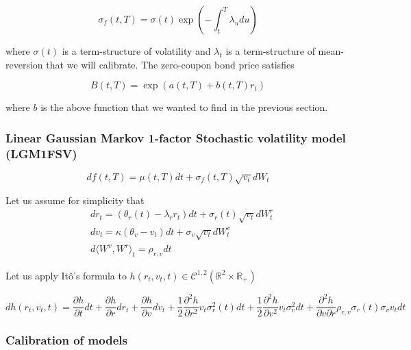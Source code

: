 \documentclass{article}
\begin{document}
\begin{equation}
	\sigma_f(t,T) = \sigma(t) \exp\left(-\int_t^T \lambda_u du \right)
\end{equation}

\noindent where $\sigma(t)$ is a term-structure of volatility and $\lambda_t$ is a term-structure of mean-reversion that we will calibrate. The zero-coupon bond price satisfies

\begin{equation}
	B(t,T) = \exp\left(a(t,T) + b(t,T) r_t\right)
\end{equation}

\noindent where $b$ is the above function that we wanted to find in the previous section.

\subsubsection{Linear Gaussian Markov 1-factor Stochastic volatility model (LGM1FSV)}

\begin{equation}	
	df(t,T) = \mu(t,T) dt + \sigma_f(t,T) \sqrt{v_t} dW_t
\end{equation}

\noindent Let us assume for simplicity that 
\begin{equation}
\begin{aligned}
	&dr_t = \left(\theta_r(t) - \lambda_r r_t\right) dt + \sigma_r(t) \sqrt{v_t} dW_t^r\\
	&dv_t = \kappa \left(\theta_v - v_t \right) dt + \sigma_v  \sqrt{v_t} dW_t^v \\
	&d\langle W^v, W^r \rangle_t = \rho_{r,v} dt
\end{aligned}
\end{equation}

\noindent Let us apply Itô's formula to $h(r_t, v_t, t) \in \mathcal{C}^{1,2}\left(\mathbb{R}^2 \times \mathbb{R}_+\right)$

\begin{equation}
	dh(r_t, v_t, t) = \frac{\partial h}{\partial t} dt + \frac{\partial h}{\partial r} dr_t + \frac{\partial h}{\partial v} dv_t + \frac{1}{2} \frac{\partial^2 h}{\partial r^2} v_t \sigma_r^2(t) dt + \frac{1}{2} \frac{\partial^2 h}{\partial v^2} v_t \sigma_v^2 dt + \frac{\partial^2 h}{\partial v \partial r} \rho_{r,v} \sigma_r(t) \sigma_v v_t dt
\end{equation}

\subsubsection{Calibration of models}
\end{document}
